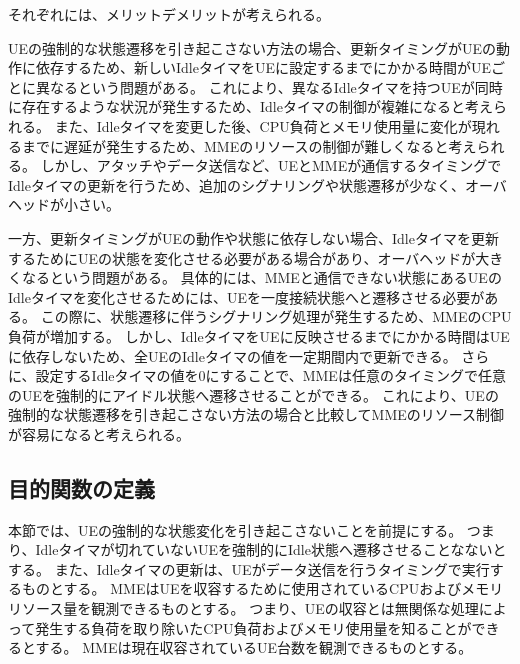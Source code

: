 \documentclass[a4j]{ujarticle}
\begin{document}
それぞれには、メリットデメリットが考えられる。

UEの強制的な状態遷移を引き起こさない方法の場合、更新タイミングがUEの動作に依存するため、新しいIdleタイマをUEに設定するまでにかかる時間がUEごとに異なるという問題がある。
これにより、異なるIdleタイマを持つUEが同時に存在するような状況が発生するため、Idleタイマの制御が複雑になると考えられる。
また、Idleタイマを変更した後、CPU負荷とメモリ使用量に変化が現れるまでに遅延が発生するため、MMEのリソースの制御が難しくなると考えられる。
しかし、アタッチやデータ送信など、UEとMMEが通信するタイミングでIdleタイマの更新を行うため、追加のシグナリングや状態遷移が少なく、オーバヘッドが小さい。

一方、更新タイミングがUEの動作や状態に依存しない場合、Idleタイマを更新するためにUEの状態を変化させる必要がある場合があり、オーバヘッドが大きくなるという問題がある。
具体的には、MMEと通信できない状態にあるUEのIdleタイマを変化させるためには、UEを一度接続状態へと遷移させる必要がある。
この際に、状態遷移に伴うシグナリング処理が発生するため、MMEのCPU負荷が増加する。
しかし、IdleタイマをUEに反映させるまでにかかる時間はUEに依存しないため、全UEのIdleタイマの値を一定期間内で更新できる。
さらに、設定するIdleタイマの値を0にすることで、MMEは任意のタイミングで任意のUEを強制的にアイドル状態へ遷移させることができる。
これにより、UEの強制的な状態遷移を引き起こさない方法の場合と比較してMMEのリソース制御が容易になると考えられる。



\subsection{目的関数の定義}
\label{sec:objective_function}
本節では、UEの強制的な状態変化を引き起こさないことを前提にする。
つまり、Idleタイマが切れていないUEを強制的にIdle状態へ遷移させることなないとする。
また、Idleタイマの更新は、UEがデータ送信を行うタイミングで実行するものとする。
MMEはUEを収容するために使用されているCPUおよびメモリリソース量を観測できるものとする。
つまり、UEの収容とは無関係な処理によって発生する負荷を取り除いたCPU負荷およびメモリ使用量を知ることができるとする。
MMEは現在収容されているUE台数を観測できるものとする。
\end{document}
